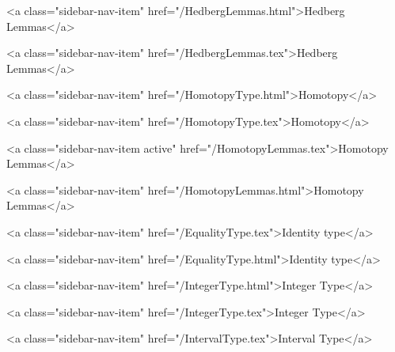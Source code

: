      
    
      
        
          <a class="sidebar-nav-item" href="/HedbergLemmas.html">Hedberg Lemmas</a>
        
      
    
      
        
          <a class="sidebar-nav-item" href="/HedbergLemmas.tex">Hedberg Lemmas</a>
        
      
    
      
        
          <a class="sidebar-nav-item" href="/HomotopyType.html">Homotopy</a>
        
      
    
      
        
          <a class="sidebar-nav-item" href="/HomotopyType.tex">Homotopy</a>
        
      
    
      
        
          <a class="sidebar-nav-item active" href="/HomotopyLemmas.tex">Homotopy Lemmas</a>
        
      
    
      
        
          <a class="sidebar-nav-item" href="/HomotopyLemmas.html">Homotopy Lemmas</a>
        
      
    
      
        
          <a class="sidebar-nav-item" href="/EqualityType.tex">Identity type</a>
        
      
    
      
        
          <a class="sidebar-nav-item" href="/EqualityType.html">Identity type</a>
        
      
    
      
        
          <a class="sidebar-nav-item" href="/IntegerType.html">Integer Type</a>
        
      
    
      
        
          <a class="sidebar-nav-item" href="/IntegerType.tex">Integer Type</a>
        
      
    
      
        
          <a class="sidebar-nav-item" href="/IntervalType.tex">Interval Type</a>
        
